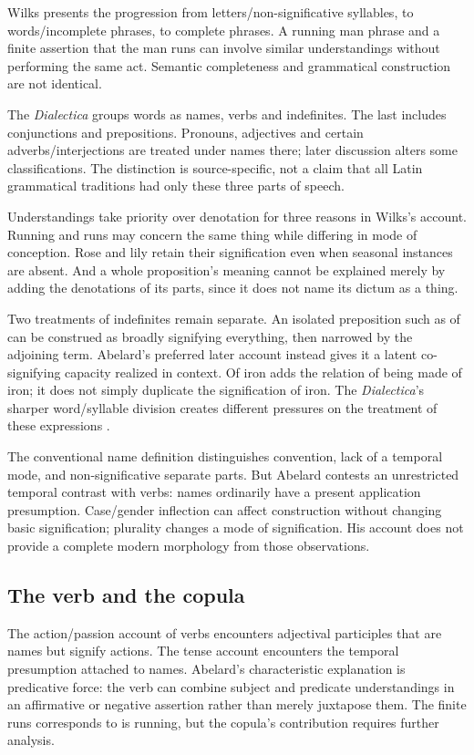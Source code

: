 Wilks presents the progression from letters/non-significative syllables,
to words/incomplete phrases, to complete phrases.
A running man phrase and a finite assertion that the man runs
can involve similar understandings without performing the same act.
Semantic completeness and grammatical construction are not identical.

The \emph{Dialectica} groups words as names, verbs and indefinites.
The last includes conjunctions and prepositions.
Pronouns, adjectives and certain adverbs/interjections are treated
under names there; later discussion alters some classifications.
The distinction is source-specific, not a claim that all Latin
grammatical traditions had only these three parts of speech.

Understandings take priority over denotation for three reasons in
Wilks's account. Running and runs may concern the same thing
while differing in mode of conception. Rose and lily retain
their signification even when seasonal instances are absent.
And a whole proposition's meaning cannot be explained merely
by adding the denotations of its parts, since it does not name
its dictum as a thing.

Two treatments of indefinites remain separate.
An isolated preposition such as of can be construed as broadly
signifying everything, then narrowed by the adjoining term.
Abelard's preferred later account instead gives it a latent
co-signifying capacity realized in context. Of iron adds the
relation of being made of iron; it does not simply duplicate
the signification of iron.
The \emph{Dialectica}'s sharper word/syllable division creates
different pressures on the treatment of these expressions
\cite[pp.~93--96]{Wilks2007FordhamAbelard}.

The conventional name definition distinguishes convention, lack
of a temporal mode, and non-significative separate parts.
But Abelard contests an unrestricted temporal contrast with verbs:
names ordinarily have a present application presumption.
Case/gender inflection can affect construction without changing
basic signification; plurality changes a mode of signification.
His account does not provide a complete modern morphology from
those observations.

\subsection{The verb and the copula}

The action/passion account of verbs encounters adjectival participles
that are names but signify actions. The tense account encounters
the temporal presumption attached to names.
Abelard's characteristic explanation is predicative force:
the verb can combine subject and predicate understandings in an
affirmative or negative assertion rather than merely juxtapose them.
The finite runs corresponds to is running, but the copula's
contribution requires further analysis.

